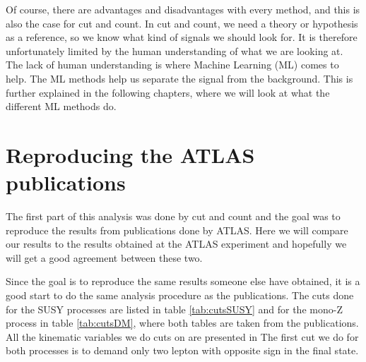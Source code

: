 Of course, there are advantages and disadvantages with every method, and this is also the case for cut and count. In cut and count, we need a theory or hypothesis as a reference, so we know what kind of signals we should look for. It is therefore unfortunately limited by the human understanding of what we are looking at. The lack of human understanding is where Machine Learning (ML) comes to help. The ML methods help us separate the signal from the background. This is further explained in the following chapters, where we will look at what the different ML methods do.

\section{Reproducing the ATLAS publications}
The first part of this analysis was done by cut and count and the goal was to reproduce the results from publications done by ATLAS. Here we will compare our results to the results obtained at the ATLAS experiment and hopefully we will get a good agreement between these two.

Since the goal is to reproduce the same results someone else have obtained, it is a good start to do the same analysis procedure as the publications. The cuts done for the SUSY processes are listed in table \ref{tab:cutsSUSY} and for the mono-Z process in table \ref{tab:cutsDM}, where both tables are taken from the publications. All the kinematic variables we do cuts on are presented in The first cut we do for both processes is to demand only two lepton with opposite sign in the final state.


